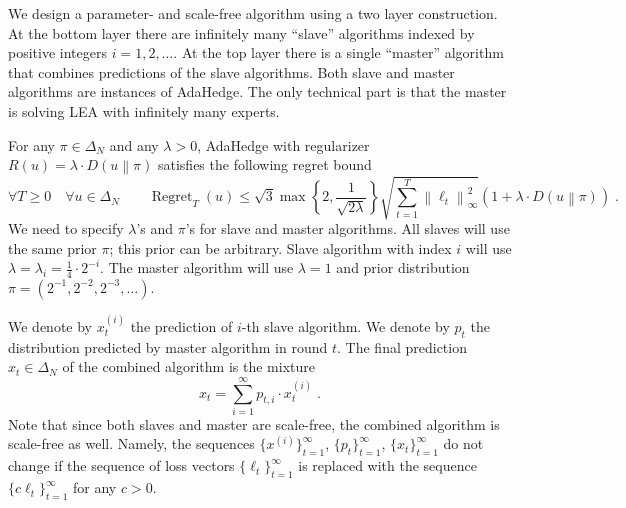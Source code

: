 \documentclass[12pt]{article}
\newcommand{\norm}[1]{\left\|#1\right\|}
\newcommand{\KL}[2]{D\left(#1 \middle\| #2 \right)}
\DeclareMathOperator{\Regret}{Regret}
\begin{document}
We design a parameter- and scale-free algorithm using a two layer construction.
At the bottom layer there are infinitely many ``slave'' algorithms indexed by
positive integers $i=1,2,\dots$. At the top layer there is a single ``master''
algorithm that combines predictions of the slave algorithms.  Both slave and
master algorithms are instances of AdaHedge. The only technical part is that
the master is solving LEA with infinitely many experts.


For any $\pi \in \Delta_N$ and any $\lambda > 0$, AdaHedge with regularizer
$R(u) = \lambda \cdot \KL{u}{\pi}$ satisfies the following regret bound
$$
\forall T \ge 0 \quad \forall u \in \Delta_N \qquad \Regret_T(u) \le \sqrt{3}\max\left\{2, \frac{1}{\sqrt{2 \lambda}}\right\} \sqrt{\sum_{t=1}^T \norm{\ell_t}_\infty^2} \left(1 + \lambda \cdot \KL{u}{\pi} \right) \; .
$$
We need to specify $\lambda$'s and $\pi$'s for slave and master algorithms.
All slaves will use the same prior $\pi$; this prior can be arbitrary.  Slave
algorithm with index $i$ will use $\lambda = \lambda_i = \frac{1}{4} \cdot 2^{-i}$. The master
algorithm will use $\lambda = 1$ and prior distribution $\pi = (2^{-1}, 2^{-2},
2^{-3}, \dots)$.

We denote by $x^{(i)}_t$ the prediction of $i$-th slave algorithm.
We denote by $p_t$ the distribution predicted by master algorithm in round $t$.
The final prediction $x_t \in \Delta_N$ of the combined algorithm is the mixture
$$
x_t = \sum_{i=1}^\infty p_{t,i} \cdot x^{(i)}_t \; .
$$
Note that since both slaves and master are scale-free, the combined algorithm
is scale-free as well. Namely, the sequences $\{x^{(i)}\}_{t=1}^\infty$,
$\{p_t\}_{t=1}^\infty$, $\{x_t\}_{t=1}^\infty$ do not change if the sequence of
loss vectors $\{\ell_t\}_{t=1}^\infty$ is replaced with the sequence $\{c
\ell_t\}_{t=1}^\infty$ for any $c > 0$.
\end{document}
